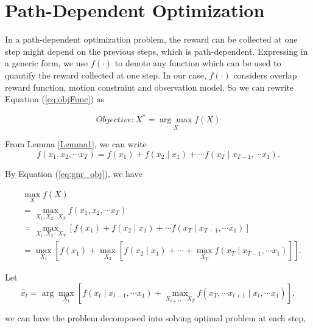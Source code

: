 \documentclass[12pt]{article}
\begin{document}
\section{Path-Dependent Optimization}

In a path-dependent optimization problem, the reward can be collected at one step might depend on the previous steps, which is path-dependent. Expressing in a generic form, we use $ f(\cdot) $ to denote any function which can be used to quantify the reward collected at one step. In our case, $ f(\cdot) $ considers overlap reward function, motion constraint and observation model. So we can rewrite Equation (\ref{eq:objFunc}) as 

\begin{equation}
\label{eq:gnr_obj}
Objective: X^{*} = \underset{X}{\arg\max} f(X)
\end{equation}

From Lemma \ref{Lemma1}, we can write
\begin{equation}
\label{eq:gnr_f_chain}
f(x_{1}, x_{2}, \cdots x_{T}) = f(x_{1}) + f(x_{2} \mid x_{1}) + \cdots f(x_{T} \mid x_{T-1}, \cdots x_{1}).
\end{equation}

By Equation (\ref{eq:gnr_obj}), we have

\begin{equation}
\label{eq:max_1}
\begin{aligned}
& \max_{X} f(X) \\
& = \max_{X_{1}, X_{2} \cdots X_{T}} f(x_{1}, x_{2}, \cdots x_{T}) \\
& = \max_{X_{1}, X_{2} \cdots X_{T}} \left[ f(x_{1}) + f(x_{2} \mid x_{1}) + \cdots f(x_{T} \mid x_{T-1}, \cdots x_{1}) \right] \\
& = \max_{X_{1}} \left[ f(x_{1}) + \max_{X_{2}} \left[ f(x_{2} \mid x_{1}) + \cdots + \max_{X_{T}} f(x_{T} \mid x_{T-1}, \cdots x_{1}) \right] \right].
\end{aligned}
\end{equation}

Let 
\begin{equation}
\label{eq:max_2}
\hat{x}_{t} = \arg \max_{X_{t}} \left[ f(x_{t} \mid x_{t-1}, \cdots x_{1})
+ \max_{X_{t+1}, \cdots X_{T}} f(x_{T}, \cdots x_{t+1} \mid x_{t}, \cdots x_{1})
\right],
\end{equation}

we can have the problem decomposed into solving optimal problem at each step,
\end{document}
